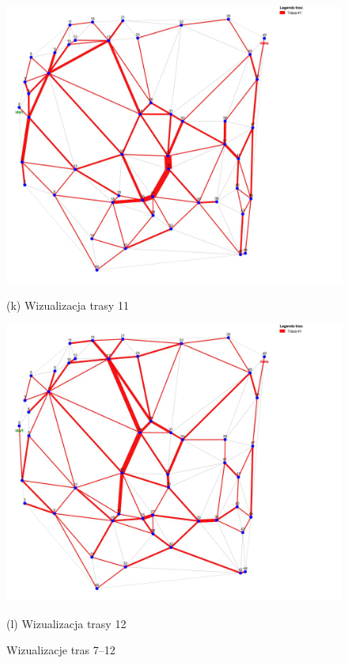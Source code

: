 \documentclass{article}
\begin{document}
\begin{figure}[H]
    \begin{minipage}[b]{0.48\linewidth}
        \includegraphics[width=\linewidth]{11.png}
        \caption*{(k) Wizualizacja trasy 11}
    \end{minipage}
    \hfill
    \begin{minipage}[b]{0.48\linewidth}
        \includegraphics[width=\linewidth]{12.png}
        \caption*{(l) Wizualizacja trasy 12}
    \end{minipage}

    \caption{Wizualizacje tras 7–12}
    \label{fig:routes-7-12}
\end{figure}
\end{document}
